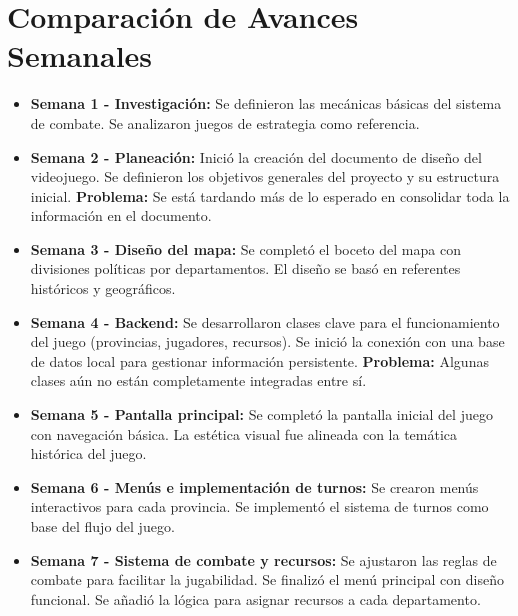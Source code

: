 \documentclass[a4paper,12pt]{article}
\begin{document}
\section{Comparación de Avances Semanales}

\begin{itemize}
    \item \textbf{Semana 1 - Investigación:} Se definieron las mecánicas básicas del sistema de combate. Se analizaron juegos de estrategia como referencia.
    
    \item \textbf{Semana 2 - Planeación:} Inició la creación del documento de diseño del videojuego. Se definieron los objetivos generales del proyecto y su estructura inicial. \textbf{Problema:} Se está tardando más de lo esperado en consolidar toda la información en el documento.

    \item \textbf{Semana 3 - Diseño del mapa:} Se completó el boceto del mapa con divisiones políticas por departamentos. El diseño se basó en referentes históricos y geográficos.

    \item \textbf{Semana 4 - Backend:} Se desarrollaron clases clave para el funcionamiento del juego (provincias, jugadores, recursos). Se inició la conexión con una base de datos local para gestionar información persistente. \textbf{Problema:} Algunas clases aún no están completamente integradas entre sí.

    \item \textbf{Semana 5 - Pantalla principal:} Se completó la pantalla inicial del juego con navegación básica. La estética visual fue alineada con la temática histórica del juego.

    \item \textbf{Semana 6 - Menús e implementación de turnos:} Se crearon menús interactivos para cada provincia. Se implementó el sistema de turnos como base del flujo del juego.

    \item \textbf{Semana 7 - Sistema de combate y recursos:} Se ajustaron las reglas de combate para facilitar la jugabilidad. Se finalizó el menú principal con diseño funcional. Se añadió la lógica para asignar recursos a cada departamento.
\end{itemize}
\end{document}
